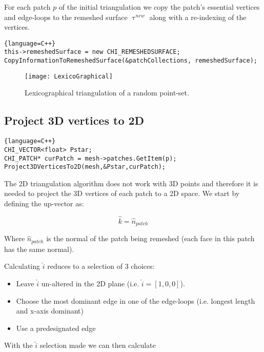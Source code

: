 \documentclass[11pt,letterpaper,titlepage]{article}
\begin{document}
\noindent For each patch $p$ of the initial triangulation we copy the patch's essential vertices and edge-loops to the remeshed surface $\uptau^{new}$ along with a re-indexing of the vertices.

\vspace{0.5cm}
\begin{lstlisting}{language=C++}
this->remeshedSurface = new CHI_REMESHEDSURFACE;
CopyInformationToRemeshedSurface(&patchCollections, remeshedSurface);
\end{lstlisting}


\begin{figure}[h]
\centering
\texttt{[image: LexicoGraphical]}
\caption{Lexicographical triangulation of a random point-set.}
\label{fig:LexicoGraphical}
\end{figure}

\subsection{Project 3D vertices to 2D}

\vspace{0.5cm}
\begin{lstlisting}{language=C++}
CHI_VECTOR<float> Pstar;
CHI_PATCH* curPatch = mesh->patches.GetItem(p);
Project3DVerticesTo2D(mesh,&Pstar,curPatch);
\end{lstlisting}


\noindent The 2D triangulation algorithm does not work with 3D points and therefore it is needed to project the 3D vertices of each patch to a 2D space. We start by defining the up-vector as:

\begin{equation*}
\hat{k} = \hat{n}_{patch}
\end{equation*}

\noindent Where $\hat{n}_{patch}$ is the normal of the patch being remeshed (each face in this patch has the same normal).

Calculating $\hat{i}$ reduces to a selection of 3 choices:
\begin{itemize}
\item Leave $\hat{i}$ un-altered in the 2D plane (i.e. $\hat{i}=[ 1, 0, 0]$).
\item Choose the most dominant edge in one of the edge-loops (i.e. longest length and x-axis dominant)
\item Use a predesignated edge
\end{itemize}

\vspace{0.5cm}
\noindent With the $\hat{i}$ selection made we can then calculate 
\end{document}
